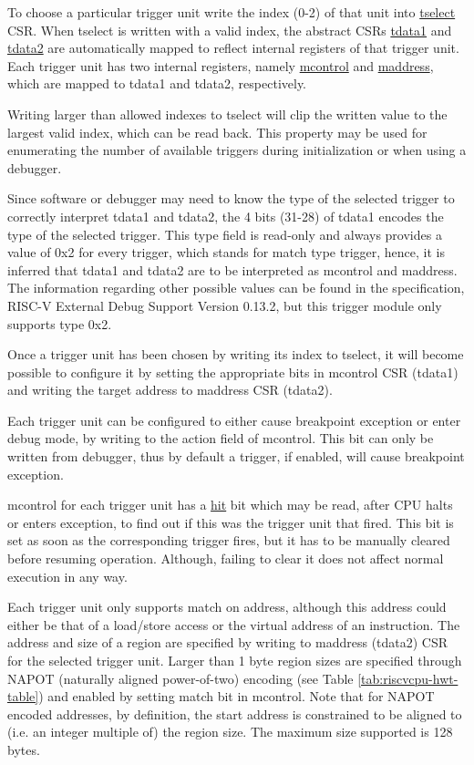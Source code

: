 \documentclass[main\_\_EN.tex]{subfiles}
\begin{document}
To choose a particular trigger unit write the index (0-2) of that unit into \hyperref[regdesc:TSELECT]{tselect} CSR. When tselect is written with a valid index, the abstract CSRs \hyperref[regdesc:TDATA1]{tdata1} and \hyperref[regdesc:TDATA2]{tdata2} are automatically mapped to reflect internal registers of that trigger unit. Each trigger unit has two internal registers, namely \hyperref[regdesc:MCONTROL]{mcontrol} and \hyperref[regdesc:MADDRESS]{maddress}, which are mapped to tdata1 and tdata2, respectively.

Writing larger than allowed indexes to tselect will clip the written value to the largest valid index, which can be read back. This property may be used for enumerating the number of available triggers during initialization or when using a debugger.

Since software or debugger may need to know the type of the selected trigger to correctly interpret tdata1 and tdata2, the 4 bits (31-28) of tdata1 encodes the type of the selected trigger. This type field is read-only and always provides a value of 0x2 for every trigger, which stands for match type trigger, hence, it is inferred that tdata1 and tdata2 are to be interpreted as mcontrol and maddress. The information regarding other possible values can be found in the specification, RISC-V External Debug Support Version 0.13.2, but this trigger module only supports type 0x2.

Once a trigger unit has been chosen by writing its index to tselect, it will become possible to configure it by setting the appropriate bits in mcontrol CSR (tdata1) and writing the target address to maddress CSR (tdata2).

Each trigger unit can be configured to either cause breakpoint exception or enter debug mode, by writing to the action field of mcontrol. This bit can only be written from debugger, thus by default a trigger, if enabled, will cause breakpoint exception.

mcontrol for each trigger unit has a \hyperref[fielddesc:MCONTROLHIT]{hit} bit which may be read, after CPU halts or enters exception, to find out if this was the trigger unit that fired. This bit is set as soon as the corresponding trigger fires, but it has to be manually cleared before resuming operation. Although, failing to clear it does not affect normal execution in any way.

Each trigger unit only supports match on address, although this address could either be that of a load/store access or the virtual address of an instruction. The address and size of a region are specified by writing to maddress (tdata2) CSR for the selected trigger unit. Larger than 1 byte region sizes are specified through NAPOT (naturally aligned power-of-two) encoding (see Table \ref{tab:riscvcpu-hwt-table}) and enabled by setting match bit in mcontrol. Note that for NAPOT encoded addresses, by definition, the start address is constrained to be aligned to (i.e. an integer multiple of) the region size. The maximum size supported is 128 bytes.
\end{document}
